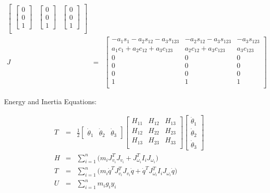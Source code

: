 \documentclass[a4paper]{article}
\begin{document}
\begin{eqnarray*}
\begin{bmatrix}
        \begin{bmatrix}
		0 \\ 0 \\ 1
		\end{bmatrix} & \begin{bmatrix}
		0 \\ 0 \\ 1
		\end{bmatrix} & \begin{bmatrix}
		0 \\ 0 \\ 1
		\end{bmatrix}\\
        \end{bmatrix}\\ 
J & = & \begin{bmatrix}
		-a_1s_1-a_2s_{12}-a_3s_{123} & -a_2 s_{12} - a_3 s_{123} & -a_3 s_{123}\\
        a_1c_1 +a_2c_{12}+a_3c_{123} & a_2 c_{12} + a_3 c_{123} & a_3 c_{123}\\
        0 & 0 & 0\\
        0 & 0 & 0\\
        0 & 0 & 0\\
        1 & 1 & 1\\
		\end{bmatrix}        
\end{eqnarray*}

\noindent Energy and Inertia Equations:

\begin{eqnarray*}
T & = & \frac{1}{2}\begin{bmatrix}
\dot{\theta}_1 & \dot{\theta}_2 & \dot{\theta}_3
\end{bmatrix}
\begin{bmatrix}
H_{11} & H_{12} & H_{13}\\
H_{12} & H_{22} & H_{23}\\
H_{13} & H_{23} & H_{33}\\
\end{bmatrix}
\begin{bmatrix}
\dot{\theta}_1 \\ \dot{\theta}_2 \\ \dot{\theta}_3
\end{bmatrix}\\
H & = & \sum_{i=1}^n \Big(m_i J_{v_i}^T J_{v_i} + J_{\omega_i}^T I_i J_{\omega_i} \Big)\\
T & = & \sum_{i=1}^n \Big(m_i \dot{q}^T J_{v_i}^T J_{v_i}\dot{q} + \dot{q}^T J_{\omega_i}^T I_i J_{\omega_i} \dot{q} \Big)\\
U & = & \sum_{i=1}^n m_ig_iy_i
\end{eqnarray*}
\end{document}
